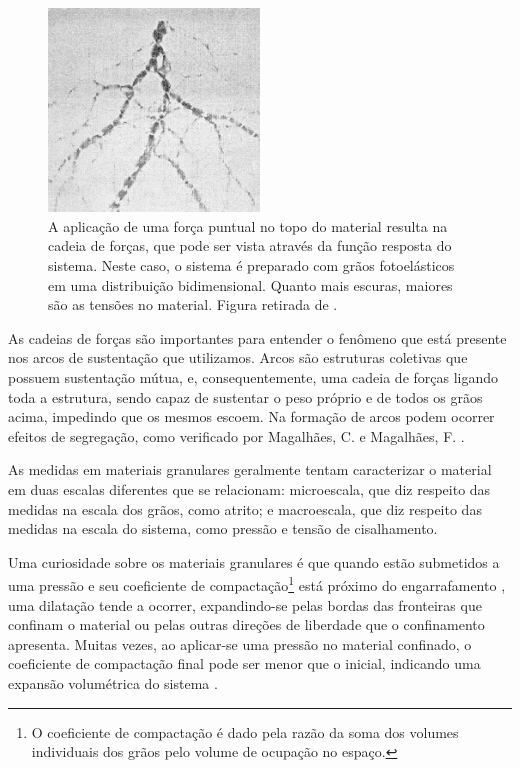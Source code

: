 \begin{figure}
    \centering
    \includegraphics[width=0.5\textwidth]{04-figuras/Cadeia_Forca.png}
    \caption{A aplicação de uma força puntual no topo do material resulta na cadeia de forças, que pode ser vista através da função resposta do sistema. Neste caso, o sistema é preparado com grãos fotoelásticos em uma distribuição bidimensional. Quanto mais escuras, maiores são as tensões no material. Figura retirada de \cite{Sensitivity_of_Stress_Response_Function_to_Packing_Preparation}.}
    \label{fig:force_chain}
\end{figure}

    As cadeias de forças são importantes para entender o fenômeno que está presente nos arcos de sustentação que utilizamos. Arcos são estruturas coletivas que possuem sustentação mútua, e, consequentemente, uma cadeia de forças ligando toda a estrutura, sendo capaz de sustentar o peso próprio e de todos os grãos acima, impedindo que os mesmos escoem. Na formação de arcos podem ocorrer efeitos de segregação, como verificado por Magalhães, C. e Magalhães, F. \cite{Caio-Tese, Felipe-Tese}.

    As medidas em materiais granulares geralmente tentam caracterizar o material em duas escalas diferentes que se relacionam: microescala, que diz respeito das medidas na escala dos grãos, como atrito; e macroescala, que diz respeito das medidas na escala do sistema, como pressão e tensão de cisalhamento.

    Uma curiosidade sobre os materiais granulares é que quando estão submetidos a uma pressão e seu coeficiente de compactação\footnote{\label{foot:packingfraction}O coeficiente de compactação é dado pela razão da soma dos volumes individuais dos grãos pelo volume de ocupação no espaço.} está próximo do engarrafamento \cite{Non-Gaussian_behavior_in_jamming_unjamming_transition_in_dense_granular_materials}, uma dilatação tende a ocorrer, expandindo-se pelas bordas das fronteiras que confinam o material ou pelas outras direções de liberdade que o confinamento apresenta. Muitas vezes, ao aplicar-se uma pressão no material confinado, o coeficiente de compactação final pode ser menor que o inicial, indicando uma expansão volumétrica do sistema \cite{Felipe-Tese}.

